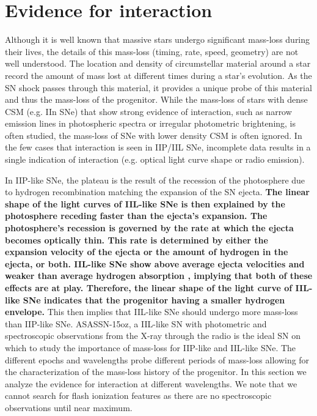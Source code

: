 \documentclass[a4paper,fleqn,usenatbib]{mnras}
\begin{document}
\section{Evidence for interaction} \label{sec:Interaction}
Although it is well known that massive stars undergo significant mass-loss during their lives, the details of this mass-loss (timing, rate, speed, geometry) are not well understood.
The location and density of circumstellar material around a star record the amount of mass lost at different times during a star's evolution. 
As the SN shock passes through this material, it provides a unique probe of this material and thus the mass-loss of the progenitor.
While the mass-loss of stars with dense CSM (e.g. IIn SNe) that show strong evidence of interaction, such as narrow emission lines in photospheric spectra or irregular photometric brightening, is often studied, the mass-loss of SNe with lower density CSM is often ignored.
In the few cases that interaction is seen in IIP/IIL SNe, incomplete data results in a single indication of interaction (e.g. optical light curve shape or radio emission).

In IIP-like SNe, the plateau is the result of the recession of the photosphere due to hydrogen recombination matching the expansion of the SN ejecta.
\textbf{The linear shape of the light curves of IIL-like SNe is then explained by the photosphere receding faster than the ejecta's expansion.
The photosphere's recession is governed by the rate at which the ejecta becomes optically thin.
This rate is determined by either the expansion velocity of the ejecta  or the amount of hydrogen in the ejecta, or both. 
IIL-like SNe show above average ejecta velocities and weaker than average hydrogen absorption \citep{2014gutierrez}, implying that both of these effects are at play.
Therefore, the linear shape of the light curve of IIL-like SNe indicates that the progenitor having a smaller hydrogen envelope.}
This then implies that IIL-like SNe should undergo more mass-loss than IIP-like SNe.
ASASSN-15oz, a IIL-like SN with photometric and spectroscopic observations from the X-ray through the radio is the ideal SN on which to study the importance of mass-loss for IIP-like and IIL-like SNe.
The different epochs and wavelengths probe different periods of mass-loss allowing for the characterization of the mass-loss history of the progenitor.
In this section we analyze the evidence for interaction at different wavelengths.
We note that we cannot search for flash ionization features as there are no spectroscopic observations until near maximum.
\end{document}
